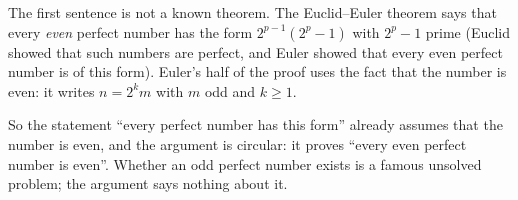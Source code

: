 The first sentence is not a known theorem. The Euclid--Euler theorem says that every \emph{even} perfect number has the form $2^{p-1}(2^p-1)$ with $2^p-1$ prime (Euclid showed that such numbers are perfect, and Euler showed that every even perfect number is of this form). Euler's half of the proof uses the fact that the number is even: it writes $n=2^{k}m$ with $m$ odd and $k\ge1$.

So the statement ``every perfect number has this form'' already assumes that the number is even, and the argument is circular: it proves ``every even perfect number is even''. Whether an odd perfect number exists is a famous unsolved problem; the argument says nothing about it.
